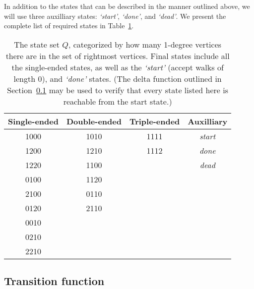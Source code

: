 In addition to the states that can be described in the manner outlined above, we will use three auxilliary states: \emph{`start'}, \emph{`done'}, and \emph{`dead'}. We present the complete list of required states in Table~\ref{tab:states}.

\begin{table}
\begin{center}
\begin{tabular}{cccc}
\hline
Single-ended & Double-ended & Triple-ended & Auxilliary \\
\hline
1000 & 1010 & 1111 & \emph{start} \\
1200 & 1210 & 1112 & \emph{done} \\
1220 & 1100 &  & \emph{dead} \\
0100 & 1120 &  &  \\
2100 & 0110 &  &  \\
0120 & 2110 &  &  \\
0010 &  &  &  \\
0210 &  &  &  \\
2210 &  &  &  \\
\hline
\end{tabular}
\end{center}
\caption{The state set $Q$, categorized by how many 1-degree vertices there are in the set of rightmost vertices. Final states include all the single-ended states, as well as the \emph{`start'} (accept walks of length 0), and \emph{`done'} states. (The delta function outlined in Section~\ref{sec:overview-delta} may be used to verify that every state listed here is reachable from the start state.)}
\label{tab:states}
\end{table}

\subsection{Transition function}
\label{sec:overview-delta}


